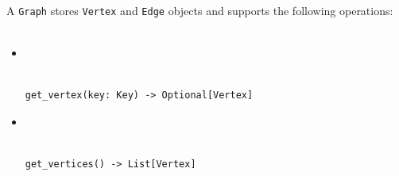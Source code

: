 \documentclass[mathserif, handout]{beamer}
\begin{document}
\begin{frame}[fragile]
	A \texttt{Graph} stores \texttt{Vertex} and \texttt{Edge} objects and supports the following operations:\\~\\
	\begin{itemize}
		\item {} \\
		      \\[-1mm]
		      \begin{lstlisting}[style=mypython]
get_vertex(key: Key) -> Optional[Vertex]
\end{lstlisting}

		\item {} \\
		      \\[-1mm]
		      \begin{lstlisting}[style=mypython]
get_vertices() -> List[Vertex]
\end{lstlisting}
	\end{itemize}

\end{frame}
\end{document}

